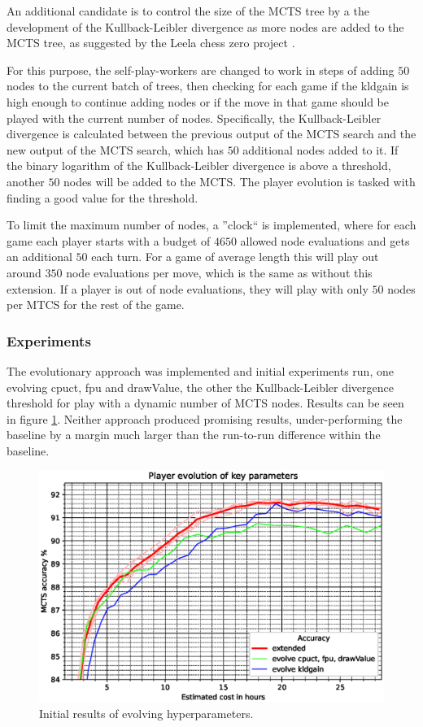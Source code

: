 \documentclass[12pt,onecolumn,oneside,titlepage]{article}
\begin{document}
An additional candidate is to control the size of the MCTS tree by a the development of the Kullback-Leibler divergence as more nodes are added to the MCTS tree, as suggested by the Leela chess zero project \cite{leela0kldgain}. 

For this purpose, the self-play-workers are changed to work in steps of adding $50$ nodes to the current batch of trees,
then checking for each game if the kldgain is high enough to continue adding nodes or if the move in that game should be played with the current number of nodes.
Specifically, the Kullback-Leibler divergence is calculated between the previous output of the MCTS search and the new output of the MCTS search, which has $50$ additional nodes added to it.
If the binary logarithm of the Kullback-Leibler divergence is above a threshold, another $50$ nodes will be added to the MCTS. The player evolution is tasked with finding a good value for the threshold.

To limit the maximum number of nodes, a ''clock`` is implemented, where for each game each player starts with a budget of $4650$ allowed node evaluations and gets an additional $50$ each turn.
For a game of average length this will play out around $350$ node evaluations per move, which is the same as without this extension. If a player is out of node evaluations, they will play with only $50$ nodes per MTCS for the rest of the game.

\subsubsection{Experiments}

The evolutionary approach was implemented and initial experiments run, one evolving cpuct, fpu and drawValue, the other the Kullback-Leibler divergence threshold for play with a dynamic number of MCTS nodes.
Results can be seen in figure \ref{fig:evolve_results}. Neither approach produced promising results, under-performing the baseline by a margin much larger than the run-to-run difference within the baseline.

\begin{figure}[H]
\centering
\includegraphics[clip,width=\columnwidth]{evolve_results}
\caption{Initial results of evolving hyperparameters.}
\label{fig:evolve_results}
\end{figure}
\end{document}
